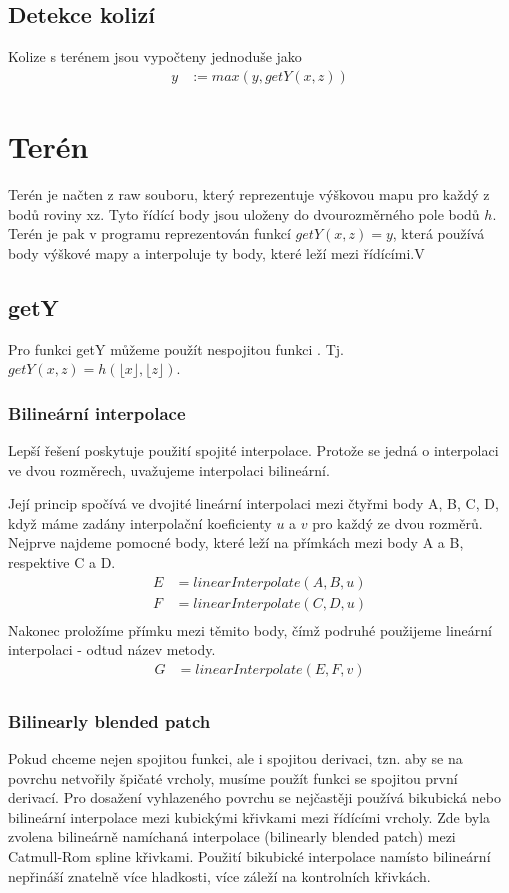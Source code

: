 \documentclass{zcu_sp}
\begin{document}
\subsection{Detekce kolizí}
Kolize s terénem jsou vypočteny jednoduše jako 
\begin{align*}
y &:= max(y, getY(x, z))
\end{align*}


\section{Terén}
Terén je načten z raw souboru, který reprezentuje výškovou mapu pro každý z
bodů roviny xz. Tyto řídící body jsou uloženy do dvourozměrného pole bodů $h$.
Terén je pak v programu reprezentován funkcí $getY(x, z) = y$, která používá
body výškové mapy a interpoluje ty body, které leží mezi řídícími.V

\subsection{getY}
Pro funkci getY můžeme použít nespojitou funkci . Tj. $getY(x, z) =
h (\lfloor x \rfloor, \lfloor z \rfloor)$.

\subsubsection{Bilineární interpolace}
Lepší řešení poskytuje použití spojité interpolace. Protože se jedná o
interpolaci ve dvou rozměrech, uvažujeme interpolaci bilineární.

Její princip spočívá ve dvojité lineární interpolaci mezi čtyřmi body A, B, C,
D, když máme zadány interpolační koeficienty $u$ a $v$ pro každý ze dvou
rozměrů. Nejprve najdeme pomocné body, které leží na přímkách mezi body A a B,
respektive C a D.
\begin{align*}
E &= linearInterpolate(A, B, u) \\
F &= linearInterpolate(C, D, u) \\
\end{align*}
Nakonec proložíme přímku mezi těmito body, čímž podruhé použijeme lineární interpolaci - odtud název metody.
\begin{align*}
G &= linearInterpolate(E, F, v) \\
\end{align*}

\subsubsection{Bilinearly blended patch}
Pokud chceme nejen spojitou funkci, ale i spojitou derivaci, tzn. aby se na
povrchu netvořily špičaté vrcholy, musíme použít funkci se spojitou první
derivací. Pro dosažení vyhlazeného povrchu se nejčastěji používá bikubická nebo
bilineární interpolace mezi kubickými křivkami mezi řídícími vrcholy. Zde byla
zvolena bilineárně namíchaná interpolace (bilinearly blended patch) mezi
Catmull-Rom spline křivkami. Použití bikubické interpolace namísto bilineární
nepřináší znatelně více hladkosti, více záleží na kontrolních křivkách.
\end{document}
